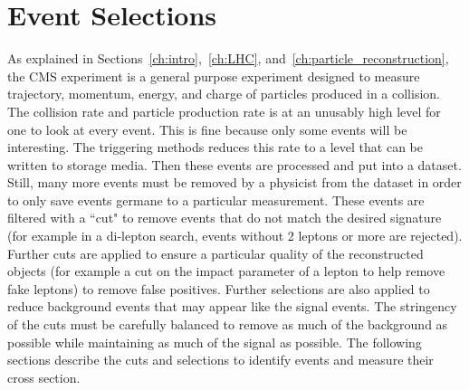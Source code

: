 \chapter{Event Selections}
\label{ch::EventSelections}
As explained in Sections~\ref{ch:intro},~\ref{ch:LHC}, and~\ref{ch:particle_reconstruction}, the CMS experiment is a general purpose experiment designed to measure trajectory, momentum, energy, and charge of particles produced in a collision. The collision rate and particle production rate is at an unusably high level for one to look at every event. This is fine because only some events will be interesting. The triggering methods reduces this rate to a level that can be written to storage media. Then these events are processed and put into a dataset. Still, many more events must be removed by a physicist from the dataset in order to only save events germane to a particular measurement. These events are filtered with a ``cut" to remove events that do not match the desired signature (for example in a di-lepton search, events without 2 leptons or more are rejected). Further cuts are applied to ensure a particular quality of the reconstructed objects (for example a cut on the impact parameter of a lepton to help remove fake leptons) to remove false positives. Further selections are also applied to reduce background events that may appear like the signal events. The stringency of the cuts must be carefully balanced to remove as much of the background as possible while maintaining as much of the signal as possible. The following sections describe the cuts and selections to identify \ttZ events and measure their cross section.\\

